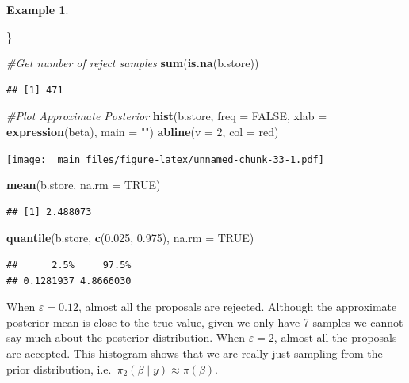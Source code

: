 \documentclass[
]{book}
\newenvironment{Shaded}{\begin{snugshade}}{\end{snugshade}}
\newcommand{\AttributeTok}[1]{\textcolor[rgb]{0.13,0.29,0.53}{#1}}
\newcommand{\CommentTok}[1]{\textcolor[rgb]{0.56,0.35,0.01}{\textit{#1}}}
\newcommand{\ConstantTok}[1]{\textcolor[rgb]{0.56,0.35,0.01}{#1}}
\newcommand{\DecValTok}[1]{\textcolor[rgb]{0.00,0.00,0.81}{#1}}
\newcommand{\FloatTok}[1]{\textcolor[rgb]{0.00,0.00,0.81}{#1}}
\newcommand{\FunctionTok}[1]{\textcolor[rgb]{0.13,0.29,0.53}{\textbf{#1}}}
\newcommand{\NormalTok}[1]{#1}
\newcommand{\StringTok}[1]{\textcolor[rgb]{0.31,0.60,0.02}{#1}}
\theoremstyle{definition}
\theoremstyle{definition}
\newtheorem{example}{Example}[chapter]
\theoremstyle{definition}
\theoremstyle{definition}
\theoremstyle{remark}
\begin{document}
\begin{example}
\begin{Shaded}
\begin{Highlighting}[]
\NormalTok{\}}

\CommentTok{\#Get number of reject samples}
\FunctionTok{sum}\NormalTok{(}\FunctionTok{is.na}\NormalTok{(b.store))}
\end{Highlighting}
\end{Shaded}

\begin{verbatim}
## [1] 471
\end{verbatim}

\begin{Shaded}
\begin{Highlighting}[]
\CommentTok{\#Plot Approximate Posterior}
\FunctionTok{hist}\NormalTok{(b.store, }\AttributeTok{freq =} \ConstantTok{FALSE}\NormalTok{, }\AttributeTok{xlab =} \FunctionTok{expression}\NormalTok{(beta), }\AttributeTok{main =} \StringTok{""}\NormalTok{)}
\FunctionTok{abline}\NormalTok{(}\AttributeTok{v =} \DecValTok{2}\NormalTok{, }\AttributeTok{col =} \StringTok{\textquotesingle{}red\textquotesingle{}}\NormalTok{)}
\end{Highlighting}
\end{Shaded}

\texttt{[image: \_main\_files/figure-latex/unnamed-chunk-33-1.pdf]}

\begin{Shaded}
\begin{Highlighting}[]
\FunctionTok{mean}\NormalTok{(b.store, }\AttributeTok{na.rm =} \ConstantTok{TRUE}\NormalTok{)}
\end{Highlighting}
\end{Shaded}

\begin{verbatim}
## [1] 2.488073
\end{verbatim}

\begin{Shaded}
\begin{Highlighting}[]
\FunctionTok{quantile}\NormalTok{(b.store, }\FunctionTok{c}\NormalTok{(}\FloatTok{0.025}\NormalTok{, }\FloatTok{0.975}\NormalTok{), }\AttributeTok{na.rm =} \ConstantTok{TRUE}\NormalTok{)}
\end{Highlighting}
\end{Shaded}

\begin{verbatim}
##      2.5%     97.5% 
## 0.1281937 4.8666030
\end{verbatim}

When \(\varepsilon = 0.12\), almost all the proposals are rejected. Although the approximate posterior mean is close to the true value, given we only have 7 samples we cannot say much about the posterior distribution. When \(\varepsilon = 2\), almost all the proposals are accepted. This histogram shows that we are really just sampling from the prior distribution, i.e.~\(\pi_2(\beta \mid y) \approx \pi(\beta)\).
\end{example}
\end{document}
